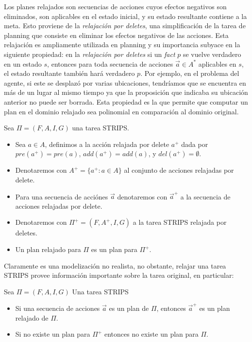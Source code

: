 Los planes relajados son secuencias de acciones cuyos efectos negativos son eliminados, son aplicables en el estado inicial, y su estado resultante contiene a la meta. Esto proviene de la \emph{relajación por deletes}, una simplificación de la tarea de planning que consiste en
eliminar los efectos negativos de las acciones. Esta
relajación es ampliamente utilizada en planning y su importancia subyace en la
siguiente propiedad: en la \emph{relajación por deletes} si un \emph{fact} $p$ se
vuelve verdadero en un estado $s$, entonces para toda secuencia de acciones $\vec{a} \in A^{*}$ aplicables en $s$, el estado resultante también hará verdadero $p$. Por ejemplo, en el
problema del agente, si este se desplazó por varias ubicaciones, tendríamos que
se encuentra en más de un lugar al mismo tiempo ya que la proposición que
indicaba su ubicación anterior no puede ser borrada. Esta propiedad es la que permite que computar un plan en el dominio relajado sea polinomial en comparación al dominio original.

\begin{mydef}
    Sea $\Pi = (F, A, I, G)$ una tarea STRIPS.
    \begin{itemize}
        \item Sea $a \in A$, definimos a la acción relajada por delete $a^{+}$
        dada por $pre(a^{+}) = pre(a)$, $add(a^{+}) = add(a)$, y $del(a^{+}) =
        \emptyset$.

        \item Denotaremos con $A^{+} = \{a^{+} : a \in A\}$ al conjunto de
        acciones relajadas por delete.

        \item Para una secuencia de acciónes $\vec{a}$ denotaremos con
        $\vec{a}^{+}$ a la secuencia de acciones relajadas por delete.

        \item Denotaremos con $\Pi^{+} = (F, A^{+}, I, G)$ a la tarea STRIPS
        relajada por deletes.

        \item Un plan relajado para $\Pi$ es un plan para $\Pi^{+}$.
    \end{itemize}
\end{mydef}

Claramente es una modelización no realista, no obstante, relajar una tarea STRIPS provee información importante sobre la tarea original, en particular:

\begin{lemma}
\label{lit:delete_relaxed_property}
Sea $\Pi = (F, A, I, G)$ Una tarea STRIPS
\begin{itemize}
    \item Si una secuencia de acciones $\vec{a}$ es un plan de $\Pi$, entonces $\vec{a}^{+}$ es un plan relajado de $\Pi$.
    \item Si no existe un plan para $\Pi^{+}$ entonces no existe un plan para $\Pi$.
\end{itemize}
\end{lemma}

